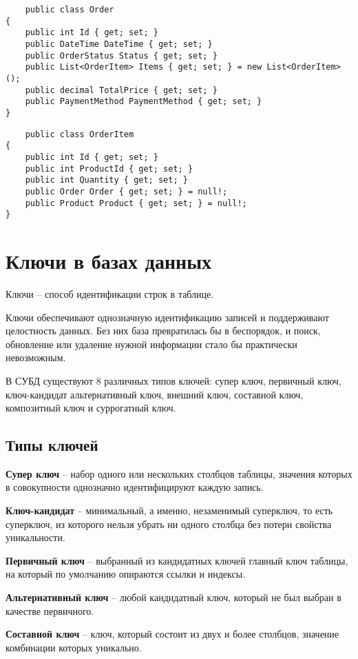 \documentclass[a4paper,12pt]{report}
\begin{document}
\begin{verbatim}
    public class Order
{
    public int Id { get; set; }
    public DateTime DateTime { get; set; }
    public OrderStatus Status { get; set; }
    public List<OrderItem> Items { get; set; } = new List<OrderItem>();
    public decimal TotalPrice { get; set; }
    public PaymentMethod PaymentMethod { get; set; }
}
\end{verbatim}

\begin{verbatim}
    public class OrderItem
{
    public int Id { get; set; }
    public int ProductId { get; set; }
    public int Quantity { get; set; }
    public Order Order { get; set; } = null!;
    public Product Product { get; set; } = null!;
}
\end{verbatim}

\section{Ключи в базах данных}

Ключи -- способ идентификации строк в таблице.

Ключи обеспечивают однозначную идентификацию записей и поддерживают целостность данных. 
Без них база превратилась бы в беспорядок, и поиск, обновление или удаление нужной 
информации стало бы практически невозможным.

В СУБД существуют 8 различных типов ключей: супер ключ, первичный ключ, ключ-кандидат
альтернативный ключ, внешний ключ, составной ключ, композитный ключ и суррогатный ключ.

\subsection{Типы ключей}

\textbf{Супер ключ} -- набор одного или нескольких столбцов таблицы, значения которых в совокупности однозначно идентифицируют каждую запись.

\textbf{Ключ-кандидат} -- минимальный, а именно, незаменимый суперключ, то есть суперключ, из которого нельзя убрать ни одного столбца без потери свойства уникальности.

\textbf{Первичный ключ} -- выбранный из кандидатных ключей главный ключ таблицы, на который по умолчанию опираются ссылки и индексы.

\textbf{Альтернативный ключ} -- любой кандидатный ключ, который не был выбран в качестве первичного.

\textbf{Составной ключ} -- ключ, который состоит из двух и более столбцов, значение комбинации которых уникально.
\end{document}
